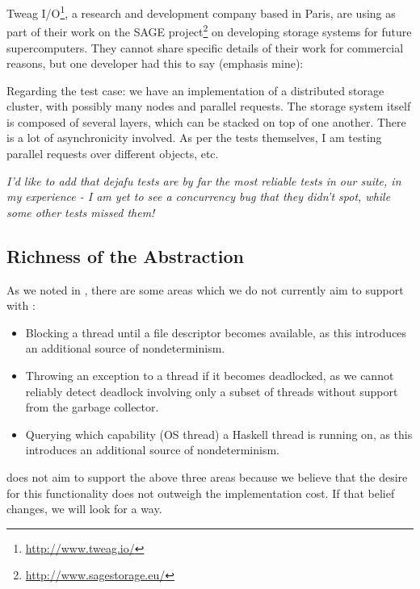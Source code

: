 Tweag I/O\footnote{\url{http://www.tweag.io/}}, a research and
development company based in Paris, are using \dejafu{} as part of
their work on the SAGE
project\footnote{\url{http://www.sagestorage.eu/}} on developing
storage systems for future supercomputers.  They cannot share specific
details of their work for commercial reasons, but one developer had
this to say (emphasis mine):

\begin{displayquote}
  Regarding the test case: we have an implementation of a distributed
  storage cluster, with possibly many nodes and parallel requests.
  The storage system itself is composed of several layers, which can
  be stacked on top of one another.  There is a lot of asynchronicity
  involved.  As per the tests themselves, I am testing parallel
  requests over different objects, etc.

  \emph{I'd like to add that dejafu tests are by far the most reliable
    tests in our suite, in my experience - I am yet to see a
    concurrency bug that they didn't spot, while some other tests
    missed them!}\cite{tweag2017}
\end{displayquote}

\subsection{Richness of the Abstraction}

As we noted in , there are some areas which we
do not currently aim to support with \dejafu{}:

\begin{itemize}
\item Blocking a thread until a file descriptor becomes available, as
  this introduces an additional source of nondeterminism.
\item Throwing an exception to a thread if it becomes deadlocked, as
  we cannot reliably detect deadlock involving only a subset of
  threads without support from the garbage collector.
\item Querying which capability (OS thread) a Haskell thread is
  running on, as this introduces an additional source of
  nondeterminism.
\end{itemize}

\dejafu{} does not aim to support the above three areas because we
believe that the desire for this functionality does not outweigh the
implementation cost.  If that belief changes, we will look for a way.

